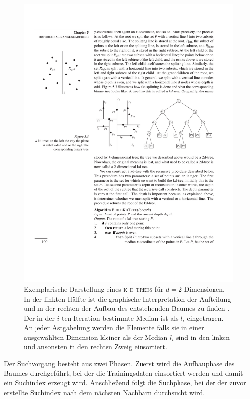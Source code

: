 \begin{figure}[h]
    \centering
    \includegraphics[width = 0.9 \textwidth]{figures/illustrations/kdtree.pdf}
    \caption{Exemplarische Darstellung eines \textsc{k-d-trees} für $d=2$ Dimensionen. In der linkten Hälfte ist die graphische Interpretation der Aufteilung und in der rechten der Aufbau des entstehenden Baumes zu finden \cite{de2000computational}. Der in der $i$-ten Iteration bestimmte Median ist als $l_i$ eingetragen. An jeder Astgabelung werden die Elemente falls sie in einer ausgewählten Dimension kleiner als der Median $l_i$ sind in den linken und ansonsten in den rechten Zweig einsortiert.}
    \label{fig:kdtree}
\end{figure}


Der Suchvorgang besteht aus zwei Phasen. Zuerst wird die Aufbauphase des Baumes durchgeführt, bei der die Trainingsdaten einsortiert werden und damit ein Suchindex erzeugt wird. Anschließend folgt die Suchphase, bei der der zuvor erstellte Suchindex nach dem nächsten Nachbarn durchsucht wird.\\

